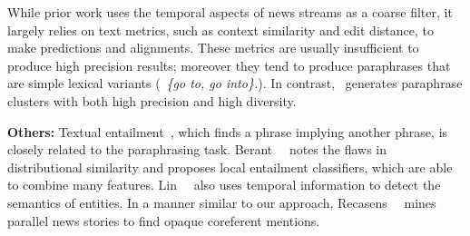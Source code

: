 While prior work uses the temporal aspects of news streams as a coarse
filter, it largely relies on text metrics, such as context similarity and
edit distance, to make predictions and alignments. These metrics are
usually insufficient to produce high precision results; moreover they tend
to produce paraphrases that are simple lexical variants (\eg\ {\it \{go to,
go into\}.}). In contrast, \sys\ generates paraphrase clusters with both high
precision and high diversity.

{\bf Others:}
Textual entailment~\cite{dagan2009recognizing}, which finds a phrase
implying another phrase, is closely related to the paraphrasing task.
Berant~\etal~ notes the flaws in distributional
similarity and proposes local entailment classifiers, which are able to combine
many features. Lin~\etal~ also uses temporal information to
detect the semantics of entities. In a manner similar to our approach,
Recasens~\etal~ mines parallel news stories to find
opaque coreferent mentions.





